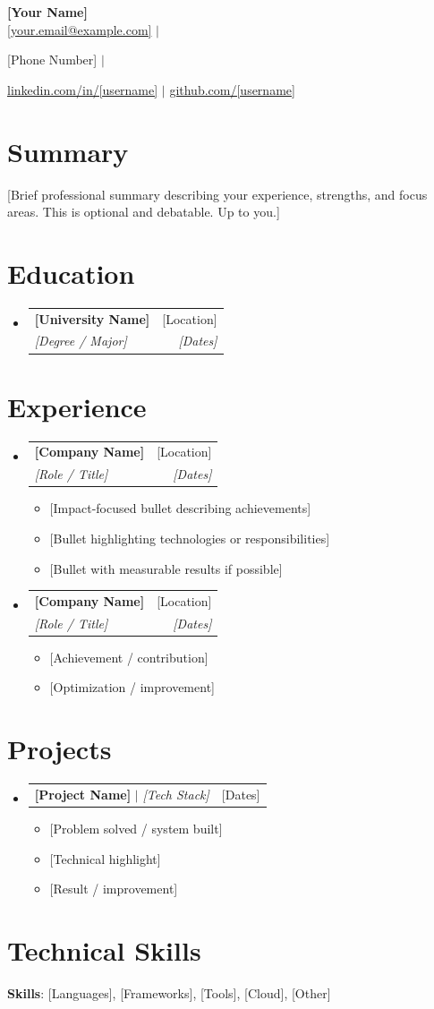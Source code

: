 \documentclass[letterpaper,11pt]{article}
\makeatletter
\newcommand{\resumeItem}[1]{
  \item\small{{#1 \vspace{-2pt}}}
}
\newcommand{\resumeSubheading}[4]{
  \vspace{-2pt}\item
    \begin{tabular*}{0.97\textwidth}[t]{l@{\extracolsep{\fill}}r}
      \textbf{#1} & #2 \\
      \textit{\small#3} & \textit{\small #4} \\
    \end{tabular*}\vspace{-7pt}
}
\newcommand{\resumeProjectHeading}[2]{
    \item
    \begin{tabular*}{0.97\textwidth}{l@{\extracolsep{\fill}}r}
      \small#1 & #2 \\
    \end{tabular*}\vspace{-7pt}
}
\newcommand{\resumeSubHeadingListStart}{\begin{itemize}[leftmargin=0.15in, label={}]}
\newcommand{\resumeSubHeadingListEnd}{\end{itemize}}
\newcommand{\resumeItemListStart}{\begin{itemize}}
\newcommand{\resumeItemListEnd}{\end{itemize}\vspace{-5pt}}
\newif\ifhide
\makeatother
\begin{document}
\begin{center}
  {\Huge \textbf{[Your Name]}} \\[4pt]
  \small
  \href{mailto:[your.email@example.com]}{[your.email@example.com]} $|$
  \ifhide
  \else
    [Phone Number] $|$
  \fi
  \href{https://linkedin.com/in/[username]}{linkedin.com/in/[username]} $|$
  \href{https://github.com/[username]}{github.com/[username]}
\end{center}

\section{Summary}
[Brief professional summary describing your experience, strengths, and focus areas. This is optional and debatable. Up to you.]

\section{Education}
\resumeSubHeadingListStart
  \resumeSubheading
    {[University Name]}{[Location]}
    {[Degree / Major]}{[Dates]}
\resumeSubHeadingListEnd

\section{Experience}
\resumeSubHeadingListStart

  \resumeSubheading
    {[Company Name]}{[Location]}
    {[Role / Title]}{[Dates]}
    \resumeItemListStart
      \resumeItem{[Impact-focused bullet describing achievements]}
      \resumeItem{[Bullet highlighting technologies or responsibilities]}
      \resumeItem{[Bullet with measurable results if possible]}
    \resumeItemListEnd

  \resumeSubheading
    {[Company Name]}{[Location]}
    {[Role / Title]}{[Dates]}
    \resumeItemListStart
      \resumeItem{[Achievement / contribution]}
      \resumeItem{[Optimization / improvement]}
    \resumeItemListEnd

\resumeSubHeadingListEnd

\section{Projects}
\resumeSubHeadingListStart

  \resumeProjectHeading
    {\textbf{[Project Name]} $|$ \emph{[Tech Stack]}}{[Dates]}
    \resumeItemListStart
      \resumeItem{[Problem solved / system built]}
      \resumeItem{[Technical highlight]}
      \resumeItem{[Result / improvement]}
    \resumeItemListEnd

\resumeSubHeadingListEnd

\section{Technical Skills}
\begin{itemize}[leftmargin=0.15in, label={}]
  \small{\item{
    \textbf{Skills}{: [Languages], [Frameworks], [Tools], [Cloud], [Other]}
  }}
\end{itemize}
\end{document}
